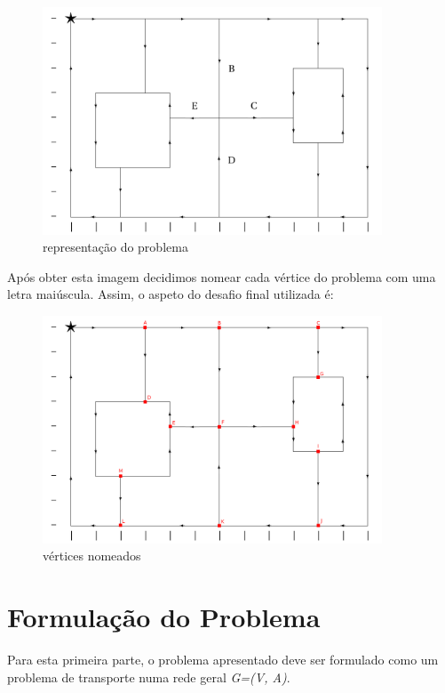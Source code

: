 \documentclass[a4paper]{report}
\begin{document}
\begin{figure}[H]
    \begin{center}
        \includegraphics[width=0.9\textwidth]{images/desafio.png}\par
        \caption{representação do problema}
        \label{fig:problem}
    \end{center}
\end{figure}
Após obter esta imagem decidimos nomear cada vértice do problema com
uma letra maiúscula. Assim, o aspeto do desafio final utilizada é:

\begin{figure}[H]
    \begin{center}
        \includegraphics[width=0.9\textwidth]{images/desafioLetras.png}\par
        \caption{vértices nomeados}
        \label{fig:named}
    \end{center}
\end{figure}

\pagebreak
\section{Formulação do Problema}
Para esta primeira parte, o problema apresentado deve ser formulado como um
problema de transporte numa rede geral \textit{G=(V, A)}.
\end{document}
